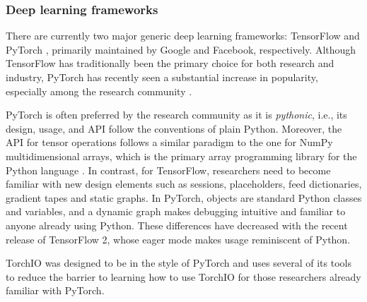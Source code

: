 \subsubsection{Deep learning frameworks}
\label{sec:frameworks}

There are currently two major generic deep learning frameworks: TensorFlow \cite{abadi_tensorflow_2016} and PyTorch \cite{paszke_pytorch_2019}, primarily maintained by Google and Facebook, respectively.
Although TensorFlow has traditionally been the primary choice for both research and industry, PyTorch has recently seen a substantial increase in popularity, especially among the research community \cite{he_state_2019}.

PyTorch is often preferred by the research community as it is \textit{pythonic}, i.e., its design, usage, and \ac{API} follow the conventions of plain Python. Moreover, the \ac{API} for tensor operations follows a similar paradigm to the one for NumPy multidimensional arrays, which is the primary array programming library for the Python language \cite{van_der_walt_numpy_2011}.
In contrast, for TensorFlow, researchers need to become familiar with new design elements such as sessions, placeholders, feed dictionaries, gradient tapes and static graphs.
In PyTorch, objects are standard Python classes and variables, and a dynamic graph makes debugging intuitive and familiar to anyone already using Python.
These differences have decreased with the recent release of TensorFlow 2, whose eager mode makes usage reminiscent of Python.

TorchIO was designed to be in the style of PyTorch and uses several of its tools to reduce the barrier to learning how to use TorchIO for those researchers already familiar with PyTorch.
